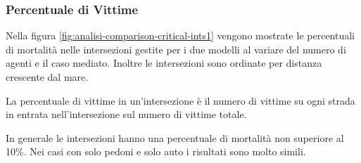 \subsubsection*{Percentuale di Vittime}
Nella figura \ref{fig:analisi-comparison-critical-ints1} vengono mostrate le percentuali di mortalità nelle intersezioni gestite per i due modelli al variare del numero di
agenti e il caso mediato. Inoltre le intersezioni sono ordinate per distanza crescente dal mare.

La percentuale di vittime in un'intersezione è il numero di vittime su ogni strada in entrata nell'intersezione sul numero di vittime totale.

In generale le intersezioni hanno una percentuale di mortalità non superiore al 10\%.
Nei casi con solo pedoni e solo auto i risultati sono molto simili.


